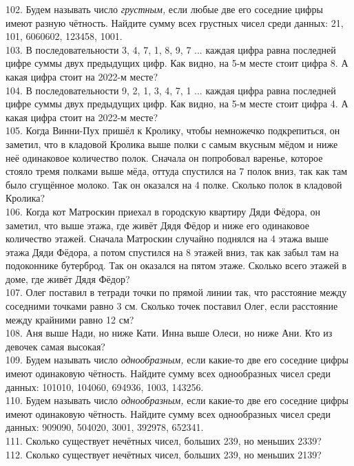 102. Будем называть число {\it грустным,} если любые две его соседние цифры имеют разную чётность. Найдите сумму всех грустных чисел среди данных: 21, 101, 6060602, 123458, 1001.\\
103. В последовательности 3, 4, 7, 1, 8, 9, 7 ... каждая цифра равна последней цифре суммы двух предыдущих цифр. Как видно, на 5-м месте стоит цифра 8. А какая цифра стоит на 2022-м месте?\\
104. В последовательности 9, 2, 1, 3, 4, 7, 1 ... каждая цифра равна последней цифре суммы двух предыдущих цифр. Как видно, на 5-м месте стоит цифра 4. А какая цифра стоит на 2022-м месте?\\
105. Когда Винни-Пух пришёл к Кролику, чтобы немножечко подкрепиться, он заметил, что в кладовой Кролика выше полки с самым вкусным мёдом и ниже неё одинаковое количество полок. Сначала он попробовал варенье, которое стояло тремя полками выше мёда, оттуда спустился на 7 полок вниз, так как там было сгущённое молоко. Так он оказался на 4 полке. Сколько полок в кладовой Кролика?\\
106. Когда кот Матроскин приехал в городскую квартиру Дяди Фёдора, он заметил, что выше этажа, где живёт Дядя Фёдор и ниже его одинаковое количество этажей. Сначала Матроскин случайно поднялся на 4 этажа выше этажа Дяди Фёдора, а потом спустился на 8 этажей вниз, так как забыл там на подоконнике бутерброд. Так он оказался на пятом этаже. Сколько всего этажей в доме, где живёт Дядя Фёдор?\\
107. Олег поставил в тетради точки по прямой линии так, что расстояние между соседними точками равно 3 см. Сколько точек поставил Олег, если расстояние между крайними равно 12 см?\\
108. Аня выше Нади, но ниже Кати. Инна выше Олеси, но ниже Ани. Кто из девочек самая высокая?\\
109. Будем называть число {\it однообразным,} если какие-то две его соседние цифры имеют одинаковую чётность. Найдите сумму всех однообразных чисел среди данных: 101010, 104060, 694936, 1003, 143256.\\
110. Будем называть число {\it однообразным,} если какие-то две его соседние цифры имеют одинаковую чётность. Найдите сумму всех однообразных чисел среди данных: 909090, 504020, 3001, 392978, 652341.\\
111. Сколько существует нечётных чисел, больших 239, но меньших 2339?\\
112. Сколько существует нечётных чисел, больших 239, но меньших 2139?\\
